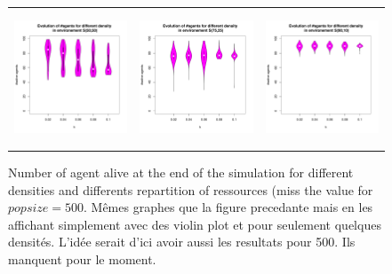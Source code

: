 \documentclass[a4paper]{article}
\begin{document}
\begin{figure}
    \begin{tabular}[H]{ccc}
	\includegraphics[height=4cm]{img/agentwrtD-REP50.pdf} &
	\includegraphics[height=4cm]{img/agentwrtD-REP75.pdf} &
	\includegraphics[height=4cm]{img/agentwrtD-REP90.pdf} \\
    \end{tabular}
    \caption{Number of agent alive at the end of the simulation for different densities and differents repartition of ressources (miss the value for $popsize=500$. Mêmes graphes que la figure precedante mais en les affichant simplement avec des violin plot et pour seulement quelques densités. L'idée serait d'ici avoir aussi les resultats pour 500. Ils manquent pour le moment. }
    \label{table:violin}
\end{figure}
\end{document}
